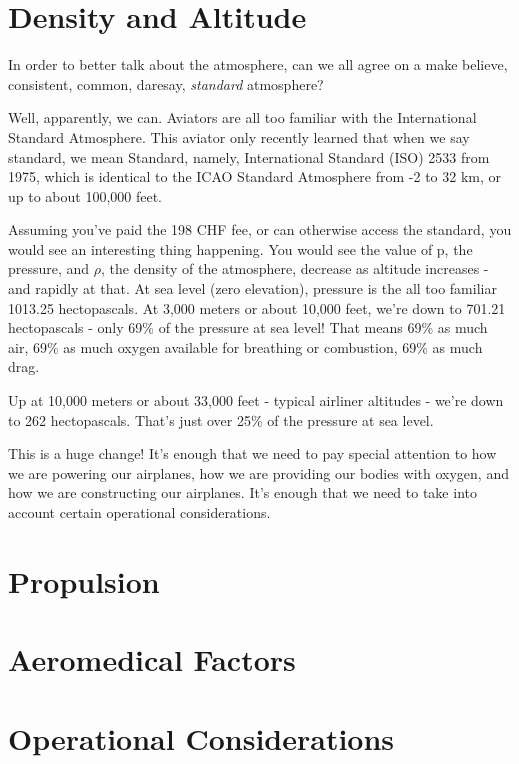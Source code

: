 \section{Density and Altitude}

In order to better talk about the atmosphere, can we all agree on a make believe, consistent, common, daresay, \emph{standard} atmosphere?

Well, apparently, we can. Aviators are all too familiar with the International Standard Atmosphere. This aviator only recently learned that when we say standard, we mean Standard, namely, International Standard (ISO) 2533 from 1975, which is identical to the ICAO Standard Atmosphere from -2 to 32 km, or up to about 100,000 feet.

Assuming you've paid the 198 CHF fee, or can otherwise access the standard, you would see an interesting thing happening. You would see the value of p, the pressure, and $\rho$, the density of the atmosphere, decrease as altitude increases - and rapidly at that. At sea level (zero elevation), pressure is the all too familiar 1013.25 hectopascals. At 3,000 meters or about 10,000 feet, we're down to 701.21 hectopascals - only 69\% of the pressure at sea level! That means 69\% as much air, 69\% as much oxygen available for breathing or combustion, 69\% as much drag.

Up at 10,000 meters or about 33,000 feet - typical airliner altitudes - we're down to 262 hectopascals. That's just over 25\% of the pressure at sea level.

This is a huge change! It's enough that we need to pay special attention to how we are powering our airplanes, how we are providing our bodies with oxygen, and how we are constructing our airplanes. It's enough that we need to take into account certain operational considerations.

\section{Propulsion}

\section{Aeromedical Factors}

\section{Operational Considerations}


